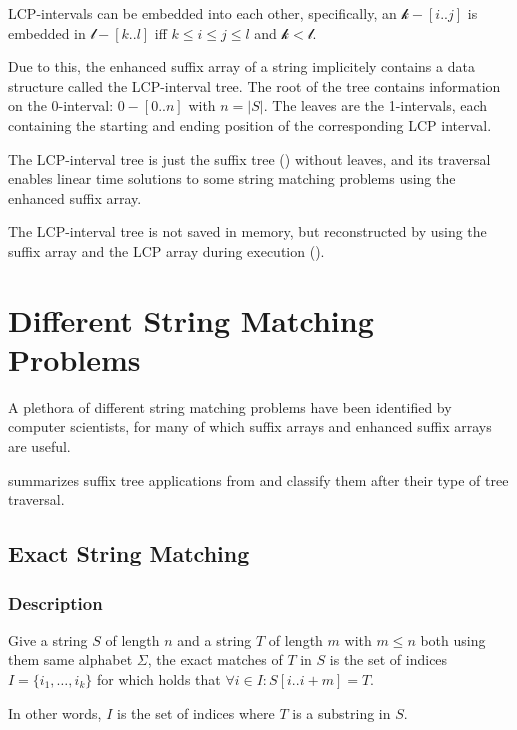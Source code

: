 \documentclass[a4paper,10pt]{article}
\begin{document}
LCP-intervals can be embedded into each other, specifically, an
$\mathcal{k}-[i..j]$ is embedded in $\mathcal{l}-[k..l]$ iff $k \le i
\le j \le l$ and $\mathcal{k}<\mathcal{l}$.

Due to this, the enhanced suffix array of a string implicitely contains
a data structure called the LCP-interval tree. The root of the tree
contains information on the 0-interval: $0-[0..n]$ with $n=|S|$. The
leaves are the 1-intervals, each containing the starting and ending
position of the corresponding LCP interval.

The LCP-interval tree is just the suffix tree (\citealt{weiner1973linear})
without leaves, and its traversal enables linear time solutions to some
string matching problems using the enhanced suffix array.

The LCP-interval tree is not saved in memory, but reconstructed
by using the suffix array and the LCP array during execution
(\citealt{abouelhoda2002enhanced}).


\section*{Different String Matching Problems}

A plethora of different string matching problems have been identified
by computer scientists, for many of which suffix arrays and enhanced
suffix arrays are useful.

\citealt[pg. 2]{abouelhoda2004replacing} summarizes suffix tree applications
from \citealt[chap. 2]{gusfield1997algorithms} and classify them after their
type of tree traversal.

\subsection*{Exact String Matching}

\subsubsection*{Description}

Give a string $S$ of length $n$ and a string $T$ of length $m$ with $m
\le n$ both using them same alphabet $\Sigma$, the exact matches of $T$
in $S$ is the set of indices $I=\{i_1, \ldots, i_k\}$ for which holds
that $\forall i \in I: S[i..i+m]=T$.

In other words, $I$ is the set of indices where $T$ is a substring in $S$.
\end{document}
